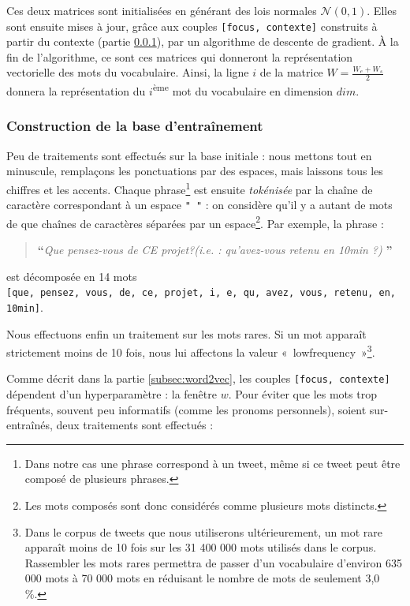 \documentclass[11pt,french,french]{article}
\let\rmarkdownfootnote\footnote%
\def\footnote{\protect\rmarkdownfootnote}
\begin{document}
Ces deux matrices sont initialisées en générant des lois normales
\(\mathcal N(0,1)\). Elles sont ensuite mises à jour, grâce aux couples
\texttt{{[}focus,\ contexte{]}} construits à partir du contexte (partie
\ref{subsec:baseentrainement}), par un algorithme de descente de
gradient. À la fin de l'algorithme, ce sont ces matrices qui donneront
la représentation vectorielle des mots du vocabulaire. Ainsi, la ligne
\(i\) de la matrice \(W=\frac{W_e+W_s}{2}\) donnera la représentation du
\(i\)\textsuperscript{ème} mot du vocabulaire en dimension \(dim\).

\subsubsection{Construction de la base
d'entraînement}\label{subsec:baseentrainement}

Peu de traitements sont effectués sur la base initiale : nous mettons
tout en minuscule, remplaçons les ponctuations par des espaces, mais
laissons tous les chiffres et les accents. Chaque phrase\footnote{Dans
  notre cas une phrase correspond à un tweet, même si ce tweet peut être
  composé de plusieurs phrases.} est ensuite \emph{tokénisée} par la
chaîne de caractère correspondant à un espace \texttt{"\ "} : on
considère qu'il y a autant de mots de que chaînes de caractères séparées
par un espace\footnote{Les mots composés sont donc considérés comme
  plusieurs mots distincts.}. Par exemple, la phrase :

\begin{quote}
\LARGE \textbf{``}\normalsize \emph{Que pensez-vous de CE projet?(i.e. : qu'avez-vous retenu en 10min ?)} \LARGE \textbf{''}\normalsize
\end{quote}

est décomposée en 14 mots
\texttt{{[}que,\ pensez,\ vous,\ de,\ ce,\ projet,\ i,\ e,\ qu,\ avez,\ vous,\ retenu,\ en,\ 10min{]}}.

Nous effectuons enfin un traitement sur les mots rares. Si un mot
apparaît strictement moins de 10 fois, nous lui affectons la valeur
«~lowfrequency~»\footnote{Dans le corpus de tweets que nous utiliserons
  ultérieurement, un mot rare apparaît moins de 10 fois sur les 31 400
  000 mots utilisés dans le corpus. Rassembler les mots rares permettra
  de passer d'un vocabulaire d'environ 635 000 mots à 70 000 mots en
  réduisant le nombre de mots de seulement 3,0 \%.}.

Comme décrit dans la partie \ref{subsec:word2vec}, les couples
\texttt{{[}focus,\ contexte{]}} dépendent d'un hyperparamètre : la
fenêtre \(w\). Pour éviter que les mots trop fréquents, souvent peu
informatifs (comme les pronoms personnels), soient sur-entraînés, deux
traitements sont effectués :
\end{document}
